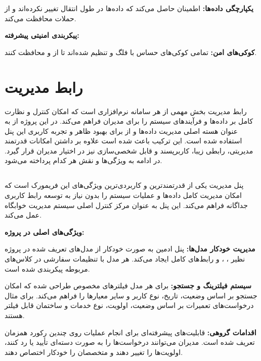 \documentclass[12pt,a4paper]{report}
\begin{document}
	\textbf{یکپارچگی داده‌ها:}  اطمینان حاصل می‌کند که داده‌ها در طول انتقال تغییر نکرده‌اند و از حملات  محافظت می‌کند.
	
	\textbf{پیکربندی امنیتی پیشرفته:}
	
	\textbf{کوکی‌های امن:} تمامی کوکی‌های حساس با فلگ  و  تنظیم شده‌اند تا از  و  محافظت کنند.
	
	\section{رابط مدیریت}
	
	رابط مدیریت بخش مهمی از هر سامانه نرم‌افزاری است که امکان کنترل و نظارت کامل بر داده‌ها و فرآیندهای سیستم را برای مدیران فراهم می‌کند. در این پروژه از  به عنوان هسته اصلی مدیریت داده‌ها و از  برای بهبود ظاهر و تجربه کاربری این پنل استفاده شده است. این ترکیب باعث شده است علاوه بر داشتن امکانات قدرتمند مدیریتی، رابطی زیبا، کاربرپسند و قابل شخصی‌سازی نیز در اختیار مدیران قرار گیرد. در ادامه به ویژگی‌ها و نقش هر کدام پرداخته می‌شود.
	
	\subsection{}
	
	پنل مدیریت  یکی از قدرتمندترین و کاربردی‌ترین ویژگی‌های این فریمورک است که امکان مدیریت کامل داده‌ها و عملیات سیستم را بدون نیاز به توسعه رابط کاربری جداگانه فراهم می‌کند. این پنل به عنوان مرکز کنترل اصلی سیستم مدیریت خوابگاه عمل می‌کند.
	
	\textbf{ویژگی‌های اصلی  در پروژه:}
	
	\textbf{مدیریت خودکار مدل‌ها:} پنل ادمین به صورت خودکار از مدل‌های تعریف شده در پروژه نظیر ، ،  و  رابط‌های  کامل ایجاد می‌کند. هر مدل با تنظیمات سفارشی در کلاس‌های  مربوطه پیکربندی شده است.
	
	\textbf{سیستم فیلترینگ و جستجو:} برای هر مدل فیلترهای مخصوص طراحی شده که امکان جستجو بر اساس وضعیت، تاریخ، نوع کاربر و سایر معیارها را فراهم می‌کند. برای مثال درخواست‌های تعمیرات بر اساس وضعیت، اولویت، نوع خدمات و ساختمان قابل فیلتر هستند.
	
	\textbf{اقدامات گروهی:} قابلیت‌های پیشرفته‌ای برای انجام عملیات روی چندین رکورد همزمان تعریف شده است. مدیران می‌توانند درخواست‌ها را به صورت دسته‌ای تأیید یا رد کنند، اولویت‌ها را تغییر دهند و متخصصان را خودکار اختصاص دهند.
	
\end{document}
